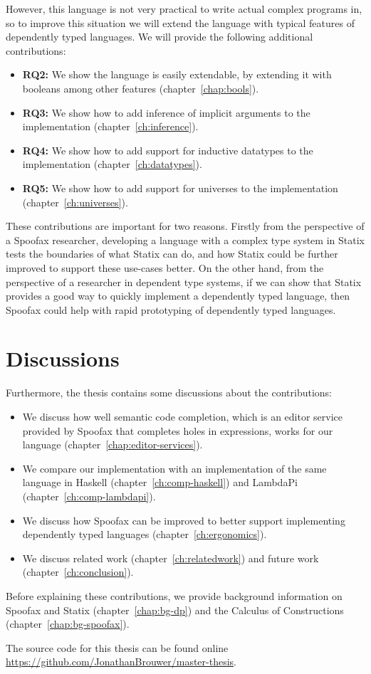 However, this language is not very practical to write actual complex programs in, so to improve this situation we will extend the language with typical features of dependently typed languages. We will provide the following additional contributions:
\begin{itemize}
	\item \textbf{RQ2:} We show the language is easily extendable, by extending it with booleans among other features (chapter~\ref{chap:bools}).
	\item \textbf{RQ3:} We show how to add inference of implicit arguments to the implementation (chapter~\ref{ch:inference}).
	\item \textbf{RQ4:} We show how to add support for inductive datatypes to the implementation (chapter~\ref{ch:datatypes}).
	\item \textbf{RQ5:} We show how to add support for universes to the implementation (chapter~\ref{ch:universes}).
\end{itemize}

These contributions are important for two reasons. Firstly from the perspective of a Spoofax researcher, developing a language with a complex type system in Statix tests the boundaries of what Statix can do, and how Statix could be further improved to support these use-cases better. On the other hand, from the perspective of a researcher in dependent type systems, if we can show that Statix provides a good way to quickly implement a dependently typed language, then Spoofax could help with rapid prototyping of dependently typed languages.

\section*{Discussions}

Furthermore, the thesis contains some discussions about the contributions:
\begin{itemize}
	\item We discuss how well semantic code completion, which is an editor service provided by Spoofax that completes holes in expressions, works for our language (chapter~\ref{chap:editor-services}).
	\item We compare our implementation with an implementation of the same language in Haskell (chapter~\ref{ch:comp-haskell}) and LambdaPi (chapter~\ref{ch:comp-lambdapi}).
	\item We discuss how Spoofax can be improved to better support implementing dependently typed languages (chapter~\ref{ch:ergonomics}).
	\item We discuss related work (chapter~\ref{ch:relatedwork}) and future work (chapter~\ref{ch:conclusion}).
\end{itemize}

\noindent Before explaining these contributions, we provide background information on Spoofax and Statix (chapter~\ref{chap:bg-dp}) and the Calculus of Constructions (chapter~\ref{chap:bg-spoofax}).

The source code for this thesis can be found online \\ \url{https://github.com/JonathanBrouwer/master-thesis}.

